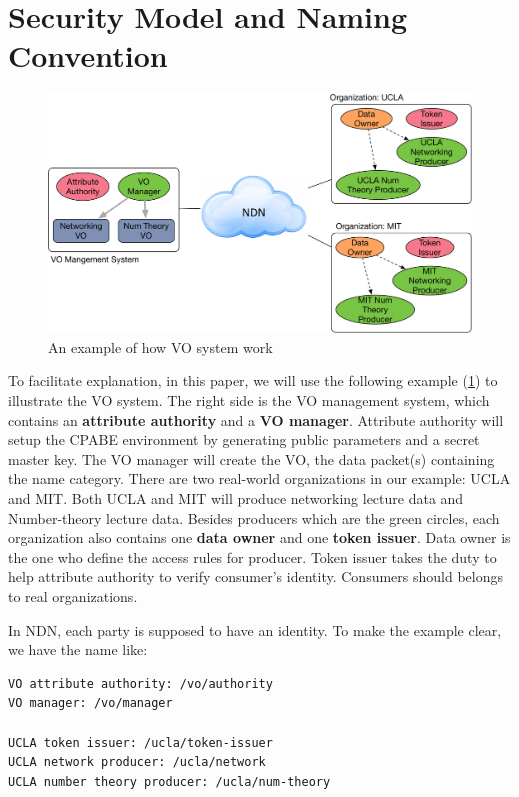 \section{Security Model and Naming Convention}

\begin{figure}[t]
  \centering
  \includegraphics[scale=0.5]{figures/example}
  \vspace{-3mm}
  \caption{An example of how VO system work}
  \label{fig:example}
\end{figure}

To facilitate explanation, in this paper, we will use the following example (\ref{fig:example}) to illustrate the VO system.
The right side is the VO management system, which contains an \textbf{attribute authority} and a \textbf{VO manager}.
Attribute authority will setup the CPABE environment by generating public parameters and a secret master key.
The VO manager will create the VO, the data packet(s) containing the name category.
There are two real-world organizations in our example: UCLA and MIT.
Both UCLA and MIT will produce networking lecture data and Number-theory lecture data.
Besides producers which are the green circles, each organization also contains one \textbf{data owner} and one \textbf{token issuer}.
Data owner is the one who define the access rules for producer.
Token issuer takes the duty to help attribute authority to verify consumer's identity.
Consumers should belongs to real organizations.

In NDN, each party is supposed to have an identity.
To make the example clear, we have the name like:

\begin{verbatim}
VO attribute authority: /vo/authority
VO manager: /vo/manager

UCLA token issuer: /ucla/token-issuer
UCLA network producer: /ucla/network
UCLA number theory producer: /ucla/num-theory
\end{verbatim}

